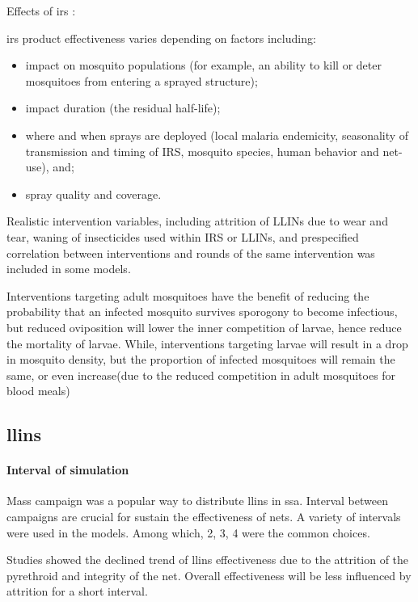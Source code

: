 \documentclass[a4paper, 12pt, twoside]{article}
\begin{document}
Effects of \gls{irs} \cite{Sherrard-Smith2018b}:

\gls{irs} product effectiveness varies depending on factors including:

\begin{itemize}
	\item impact on mosquito populations (for example, an ability to kill or deter mosquitoes from entering a sprayed structure);
	\item impact duration (the residual half-life);
	\item where and when sprays are deployed (local malaria endemicity, seasonality of transmission and timing of IRS, mosquito species, human behavior and net-use), and;
	\item spray quality and coverage.
\end{itemize}

Realistic intervention variables, including attrition of LLINs due to wear and tear, waning of insecticides used within IRS or LLINs, and prespecified correlation between interventions and rounds of the same intervention was included in some models\cite{Walker2016}.

Interventions targeting adult mosquitoes have the benefit of reducing the probability that an infected mosquito survives sporogony to become infectious, but reduced oviposition will lower the inner competition of larvae, hence reduce the mortality of larvae.
While, interventions targeting larvae will result in a drop in mosquito density, but the proportion of infected mosquitoes will remain the same, or even increase(due to the reduced competition in adult mosquitoes for blood meals)

\subsection{\gls{llins}}%
\label{sub:llins}

\paragraph{Interval of simulation}%
\label{par:interval_of_simulation}
Mass campaign was a popular way to distribute \gls{llins} in \gls{ssa}.
Interval between campaigns are crucial for sustain the effectiveness of nets.
A variety of intervals were used in the models.
Among which, 2, 3, 4\cite{Walker2016} were the common choices.

Studies showed the declined trend of \gls{llins} effectiveness due to the attrition of the pyrethroid and integrity of the net.
Overall effectiveness will be less influenced by attrition for a short interval.
\end{document}
